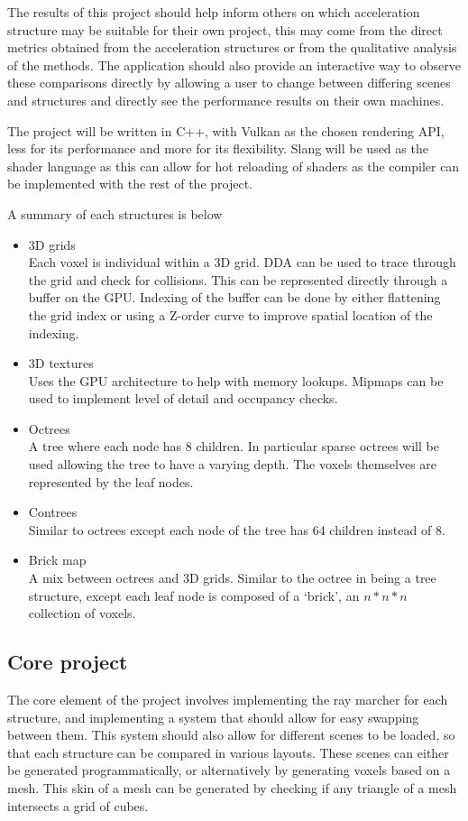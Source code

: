 The results of this project should help inform others on which
acceleration structure may be suitable for their own project, this
may come from the direct metrics obtained from the acceleration
structures or from the qualitative analysis of the methods.
The application should also provide an interactive way to observe these
comparisons directly by allowing a user to change between differing scenes
and structures and directly see the performance results on their own machines.

The project will be written in C++, with Vulkan as the chosen rendering API,
less for its performance and more for its flexibility.
Slang will be used as the shader language as this can allow for hot reloading
of shaders as the compiler can be implemented with the rest of the project.

A summary of each structures is below
\begin{itemize}[noitemsep]
  \item 3D grids \\
    Each voxel is individual within a 3D grid. DDA can be used to
    trace through the grid and check for collisions. This can be
    represented directly through a buffer on the GPU. Indexing of the buffer
    can be done by either flattening the grid index or using a Z-order curve
    to improve spatial location of the indexing.
  \item 3D textures \\
    Uses the GPU architecture to help with memory lookups. Mipmaps
    can be used to implement level of detail and occupancy checks.
  \item Octrees \\
    A tree where each node has 8 children. In particular sparse octrees will be
    used allowing the tree to have a varying depth. The voxels themselves are
    represented by the leaf nodes.
  \item Contrees \\
    Similar to octrees except each node of the tree has $64$ children
    instead of $8$.
  \item Brick map \\
    A mix between octrees and 3D grids. Similar to the octree in
    being a tree structure, except each leaf node is composed of a `brick', an
    $n*n*n$ collection of voxels.
\end{itemize}

\subsection*{Core project}
The core element of the project involves implementing the ray marcher
for each structure, and implementing a system that should allow
for easy swapping between them. This system should also allow for different
scenes to be loaded, so that each structure can be compared in various layouts.
These scenes can either be generated programmatically, or
alternatively by generating voxels based on a mesh. This skin of a mesh can
be generated by checking if any triangle of a mesh intersects a grid of cubes.

